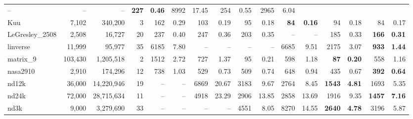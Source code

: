\begin{landscape}
\begin{table}
\begin{tabular}{lrrr||rr|rr|rr|rr|rr|rr}
          --   &       --  &       --   & \textbf{     227} & \textbf{    
          0.46}  &     8992 &    17.45  &      254 &     0.55  &     2965 &     
          6.04\\
                   Kuu  &  7,102  &  340,200  &  3  &      162 &     0.29  
                   &      103 &     0.19  &       95 &     0.18  & 
                   \textbf{      84} & \textbf{    0.16}  &       94 &     
                   0.18  &       84 &     0.17\\
        LeGresley\_2508  &  2,508  &  16,727  &  20  &      237 &     0.40  
        &      247 &     0.36  &      203 &     0.35  &       --  &       --   
        &      185 &     0.33  & \textbf{     166} & \textbf{    0.31}\\
              linverse  &  11,999  &  95,977  &  35  &     6185 &     7.80  
              &       --  &       --   &       --  &       --   &     6685 
              &     9.51  &     2175 &     3.07  & \textbf{     933} & 
              \textbf{    1.44}\\
              matrix\_9  &  103,430  &  1,205,518  &  2  &     1512 &     2.72  
              &      727 &     1.37  &       95 &     0.21  &      598 &     
              1.18  & \textbf{      87} & \textbf{    0.20}  &      558 &     
              1.16\\
              nasa2910  &  2,910  &  174,296  &  12  &      738 &     1.03  
              &      529 &     0.73  &      509 &     0.74  &      648 &     
              0.94  &      435 &     0.67  & \textbf{     392} & \textbf{    
              0.64}\\
                 nd12k  &  36,000  &  14,220,946  &  19  &       --  &       
                 --   &     6869 &    20.67  &     3183 &     9.67  &     2764 
                 &     8.45  & \textbf{    1543} & \textbf{    4.81}  &     
                 1693 &     5.35\\
                 nd24k  &  72,000  &  28,715,634  &  11  &       --  &       
                 --   &     4918 &    23.29  &     2906 &    13.85  &     2858 
                 &    13.69  &     1916 &     9.35  & \textbf{    1457} & 
                 \textbf{    7.16}\\
                  nd3k  &  9,000  &  3,279,690  &  33  &       --  &       --   
                  &       --  &       --   &     4551 &     8.05  &     8270 
                  &    14.55  & \textbf{    2640} & \textbf{    4.78}  &     
                  3196 &     5.87\\

\end{tabular}
\end{table}
\end{landscape}
